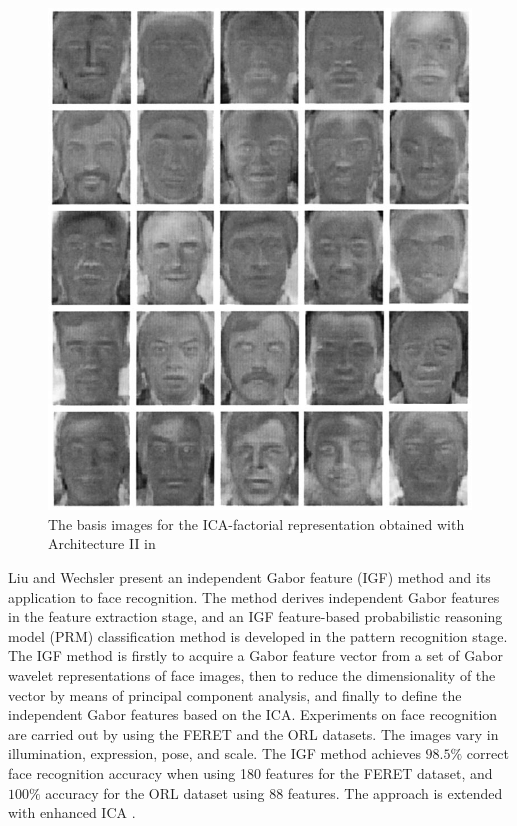 \begin{figure}[ht]
 \begin{center}
  \includegraphics[width=0.7\columnwidth]{ch2/figures/25ICsArch2.jpg}
  \caption{The basis images for the ICA-factorial representation obtained with Architecture II in \cite{Bartlett2002}}
  \label{fig:25ICs2}
 \end{center}
\end{figure} 

Liu and Wechsler \cite{Liu2003} present an independent Gabor feature (IGF) method and its application to face recognition. The method derives independent Gabor features in the feature extraction stage, and an IGF feature-based probabilistic reasoning model (PRM) classification method is developed in the pattern recognition stage. The IGF method is firstly to acquire a Gabor feature vector from a set of Gabor wavelet representations of face images, then to reduce the dimensionality of the vector by means of principal component analysis, and finally to define the independent Gabor features based on the ICA. Experiments on face recognition are carried out by using the FERET and the ORL datasets. The images vary in illumination, expression, pose, and scale. The IGF method achieves $98.5\%$ correct face recognition accuracy when using 180 features for the FERET dataset, and $100\%$ accuracy for the ORL dataset using $88$ features. The approach is extended with enhanced ICA \cite{Liu2004smc}.
